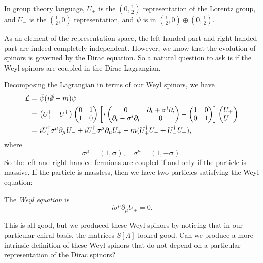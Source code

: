 \documentclass[a4paper]{article}
\begin{document}
In group theory language, $U_+$ is the $(0, \frac{1}{2})$ representation of the Lorentz group, and $U_-$ is the $(\frac{1}{2}, 0)$ representation, and $\psi$ is in $(\frac{1}{2}, 0) \oplus (0, \frac{1}{2})$.

As an element of the representation space, the left-handed part and right-handed part are indeed completely independent. However, we know that the evolution of spinors is governed by the Dirac equation. So a natural question to ask is if the Weyl spinors are coupled in the Dirac Lagrangian.

Decomposing the Lagrangian in terms of our Weyl spinors, we have
\begin{align*}
  \mathcal{L} &= \bar\psi(i\slashed\partial - m)\psi\\
  &=
  \begin{pmatrix}
    U_+^\dagger & U_-^\dagger
  \end{pmatrix}
  \begin{pmatrix}
    0 & 1\\
    1 & 0
  \end{pmatrix}
  \left[
    i
    \begin{pmatrix}
      0 & \partial_t + \sigma^i \partial_i\\
      \partial_t - \sigma^i \partial_i & 0
    \end{pmatrix} -
    \begin{pmatrix}
      1 & 0\\
      0 & 1
  \end{pmatrix}\right]
  \begin{pmatrix}
    U_+\\ U_-
  \end{pmatrix}\\
  &= i U_i^\dagger \sigma^\mu \partial_\mu U_- + i U_+^\dagger \bar\sigma^\mu \partial_\mu U_+ - m(U_+^\dagger U_- + U_-^\dagger U_+),
\end{align*}
where
\[
  \sigma^\mu = (1, \boldsymbol\sigma),\quad \bar{\sigma}^\mu = (1, -\boldsymbol\sigma).
\]
So the left and right-handed fermions are coupled if and only if the particle is massive. If the particle is massless, then we have two particles satisfying the Weyl equation:
\begin{defi}
  The \emph{Weyl equation} is
  \[
    i \bar{\sigma}^\mu \partial_\mu U_+ = 0.
  \]
\end{defi}

This is all good, but we produced these Weyl spinors by noticing that in our particular chiral basis, the matrices $S[\Lambda]$ looked good. Can we produce a more intrinsic definition of these Weyl spinors that do not depend on a particular representation of the Dirac spinors?
\end{document}

